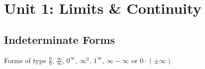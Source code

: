 \section*{Unit 1: Limits \& Continuity}
\subsection*{Indeterminate Forms}
Forms of type $\frac{0}{0}$, $\frac{\infty}{\infty}$, $0^\infty$, $\infty^0$, $1^\infty$, $\infty-\infty$ or $0\cdot\left(\pm\infty\right)$
